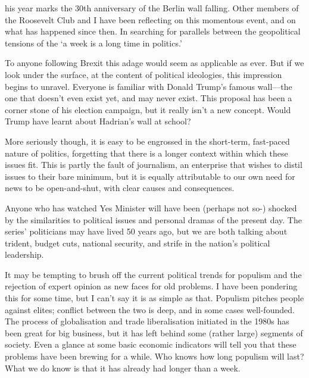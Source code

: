 \label{ch:one-week-in-politics}

{\flushright{}}
\smallskip

his year marks the 30th anniversary of the Berlin wall falling. Other
   members of the Roosevelt Club and I have been reflecting on this
   momentous event, and on what has happened since then. In searching for
   parallels between the geopolitical tensions of the `a week is a long
   time in politics.'

   To anyone following Brexit this adage would seem as applicable as ever.
   But if we look under the surface, at the content of political
   ideologies, this impression begins to unravel. Everyone is familiar
   with Donald Trump's famous wall---the one that doesn't even exist yet,
   and may never exist. This proposal has been a corner stone of his
   election campaign, but it really isn't a new concept. Would Trump have
   learnt about Hadrian's wall at school?

   More seriously though, it is easy to be engrossed in the short-term,
   fast-paced nature of politics, forgetting that there is a longer
   context within which these issues fit. This is partly the fault of
   journalism, an enterprise that wishes to distil issues to their bare
   minimum, but it is equally attributable to our own need for news to be
   open-and-shut, with clear causes and consequences.

   Anyone who has watched Yes Minister will have been (perhaps not so-)
   shocked by the similarities to political issues and personal dramas of
   the present day. The series' politicians may have lived 50 years ago,
   but we are both talking about trident, budget cuts, national security,
   and strife in the nation's political leadership.

   It may be tempting to brush off the current political trends for
   populism and the rejection of expert opinion as new faces for old
   problems. I have been pondering this for some time, but I can't say it
   is as simple as that. Populism pitches people against elites; conflict
   between the two is deep, and in some cases well-founded. The process of
   globalisation and trade liberalisation initiated in the 1980s has been
   great for big business, but it has left behind some (rather large)
   segments of society. Even a glance at some basic economic indicators
   will tell you that these problems have been brewing for a while. Who
   knows how long populism will last? What we do know is that it has
   already had longer than a week.

